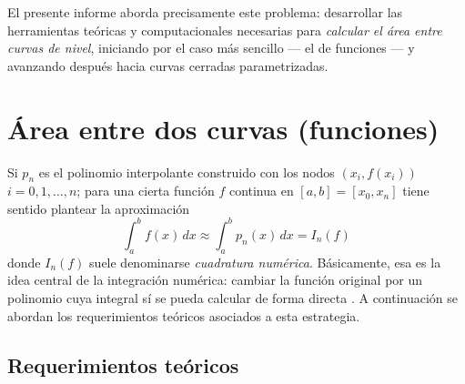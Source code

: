 \documentclass[12pt]{article}
\begin{document}
El presente informe aborda precisamente este problema: desarrollar las herramientas teóricas y computacionales necesarias para \textit{calcular el área entre curvas de nivel}, iniciando por el caso más sencillo --- el de funciones --- y avanzando después hacia curvas cerradas parametrizadas.

\section*{Área entre dos curvas (funciones)}

Si $p_n$ es el polinomio interpolante construido con los nodos $(x_i, f(x_i))$ $i=0,1,\ldots,n$; para una cierta función $f$ continua en $[a,b] = [x_0,x_n]$ tiene sentido plantear la aproximación
\[
\int_a^b f(x)\,dx \approx \int_a^b p_n(x)\,dx = I_n(f)
\]
donde $I_n(f)$ suele denominarse \textit{cuadratura numérica}. Básicamente, esa es la idea central de la integración numérica: cambiar la función original por un polinomio cuya integral sí se pueda calcular de forma directa \cite{cheney08}. A continuación se abordan los requerimientos teóricos asociados a esta estrategia.

\subsection*{Requerimientos teóricos}
\end{document}
